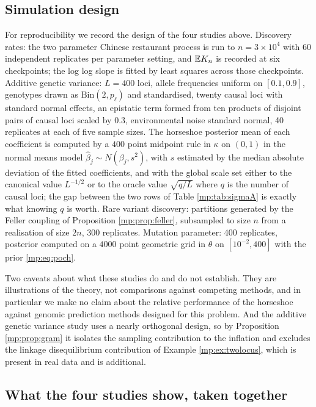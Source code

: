 \subsection{Simulation design}
\label{mp:sec:design}

For reproducibility we record the design of the four studies above. Discovery rates: the
two parameter Chinese restaurant process is run to $n=3\times10^4$ with 60 independent
replicates per parameter setting, and $\mathbb{E} K_n$ is recorded at six checkpoints; the log log
slope is fitted by least squares across those checkpoints. Additive genetic variance:
$L=400$ loci, allele frequencies uniform on $[0.1,0.9]$, genotypes drawn as
$\mathrm{Bin}(2,p_\ell)$ and standardised, twenty causal loci with standard normal effects,
an epistatic term formed from ten products of disjoint pairs of causal loci scaled by $0.3$,
environmental noise standard normal, 40 replicates at each of five sample sizes. The
horseshoe posterior mean of each coefficient is computed by a $400$ point midpoint rule in
$\kappa$ on $(0,1)$ in the normal means model $\hat\beta_j\sim N(\beta_j,s^2)$, with $s$
estimated by the median absolute deviation of the fitted coefficients, and with the global
scale set either to the canonical value $L^{-1/2}$ or to the oracle value $\sqrt{q/L}$ where
$q$ is the number of causal loci; the gap between the two rows of Table \ref{mp:tab:sigmaA}
is exactly what knowing $q$ is worth. Rare variant discovery: partitions generated by the Feller coupling of
Proposition \ref{mp:prop:feller}, subsampled to size $n$ from a realisation of size $2n$, 300
replicates. Mutation parameter: 400 replicates, posterior computed on a $4000$ point
geometric grid in $\theta$ on $[10^{-2},400]$ with the prior \eqref{mp:eq:poch}.

Two caveats about what these studies do and do not establish. They are illustrations of the
theory, not comparisons against competing methods, and in particular we make no claim about
the relative performance of the horseshoe against genomic prediction methods designed for
this problem. And the additive genetic variance study uses a nearly orthogonal design, so
by Proposition \ref{mp:prop:gram} it isolates the sampling contribution to the inflation and
excludes the linkage disequilibrium contribution of Example \ref{mp:ex:twolocus}, which is
present in real data and is additional.

\subsection{What the four studies show, taken together}
\label{mp:sec:together}

